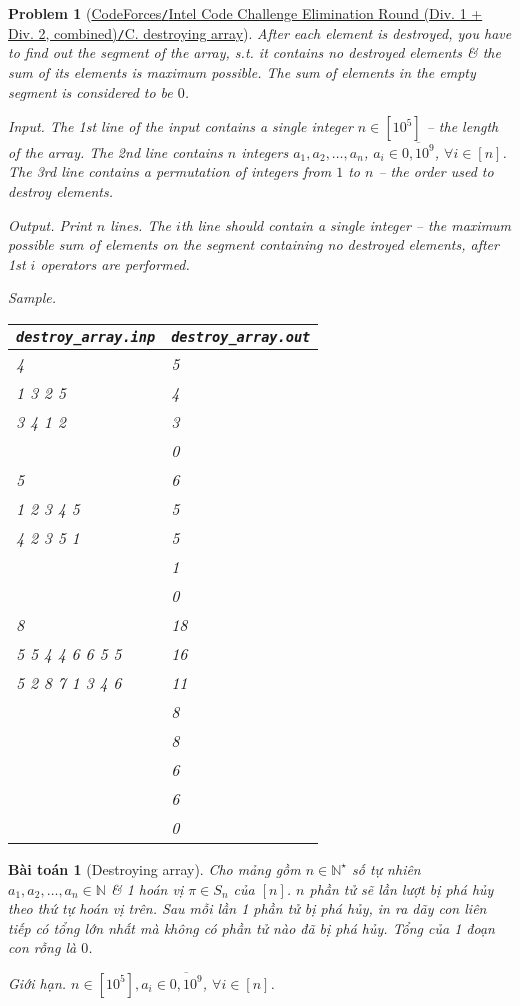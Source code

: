 \documentclass{article}
\newtheorem{baitoan}{Bài toán}
\newtheorem{problem}{Problem}
\begin{document}
\begin{problem}[\href{https://codeforces.com/contest/722/problem/C}{CodeForces{\tt/}Intel Code Challenge Elimination Round (Div. 1 + Div. 2, combined){\tt/}C. destroying array}]
    After each element is destroyed, you have to find out the segment of the array, s.t. it contains no destroyed elements \& the sum of its elements is maximum possible. The sum of elements in the empty segment is considered to be $0$.
    \item {\sf Input.} The 1st line of the input contains a single integer $n\in[10^5]$ -- the length of the array. The 2nd line contains $n$ integers $a_1,a_2,\ldots,a_n$, $a_i\in\overline{0,10^9}$, $\forall i\in[n]$. The 3rd line contains a permutation of integers from $1$ to $n$ -- the order used to destroy elements.
    \item {\sf Output.} Print $n$ lines. The $i$th line should contain a single integer -- the maximum possible sum of elements on the segment containing no destroyed elements, after 1st $i$ operators are performed.
    \item {\sf Sample.}
    \begin{table}[H]
        \centering
        \begin{tabular}{|l|l|}
            \hline
            \verb|destroy_array.inp| & \verb|destroy_array.out| \\
            \hline
            4 & 5 \\
            1 3 2 5 & 4 \\
            3 4 1 2 & 3 \\
            & 0 \\
            \hline
            5 & 6 \\
            1 2 3 4 5 & 5 \\
            4 2 3 5 1 & 5 \\
            & 1 \\
            & 0 \\
            \hline
            8 & 18 \\
            5 5 4 4 6 6 5 5 & 16 \\
            5 2 8 7 1 3 4 6 & 11 \\
            & 8 \\
            & 8 \\
            & 6 \\
            & 6 \\
            & 0 \\
            \hline
        \end{tabular}
    \end{table}
\end{problem}

\begin{baitoan}[Destroying array]
    Cho mảng gồm $n\in\mathbb{N}^\star$ số tự nhiên $a_1,a_2,\ldots,a_n\in\mathbb{N}$ \& 1 hoán vị $\pi\in S_n$ của $[n]$. $n$ phần tử sẽ lần lượt bị phá hủy theo thứ tự hoán vị trên. Sau mỗi lần 1 phần tử bị phá hủy, in ra dãy con liên tiếp có tổng lớn nhất mà không có phần tử nào đã bị phá hủy. Tổng của 1 đoạn con rỗng là $0$.
    \item {\sf Giới hạn.} $n\in[10^5],a_i\in\overline{0,10^9}$, $\forall i\in[n]$.
\end{baitoan}
\end{document}
